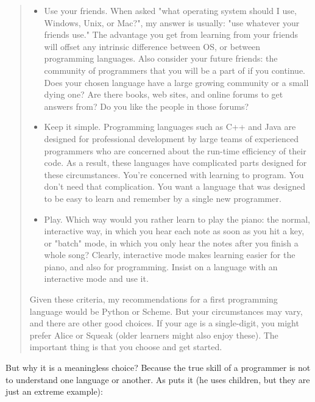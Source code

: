 \begin{quote}
    \begin{itemize}
        \item Use your friends. When asked "what operating system should I use,
        Windows, Unix, or Mac?", my answer is usually: "use whatever your friends
        use." The advantage you get from learning from your friends will offset any
        intrinsic difference between OS, or between programming languages. Also
        consider your future friends: the community of programmers that you will be
        a part of if you continue. Does your chosen language have a large growing
        community or a small dying one? Are there books, web sites, and online
        forums to get answers from? Do you like the people in those forums?  
        
        \item Keep it simple. Programming languages such as C++ and Java are designed for
        professional development by large teams of experienced programmers who are
        concerned about the run-time efficiency of their code. As a result, these
        languages have complicated parts designed for these circumstances. You're
        concerned with learning to program. You don't need that complication. You
        want a language that was designed to be easy to learn and remember by a
        single new programmer.  
        \item Play. Which way would you rather learn to play
        the piano: the normal, interactive way, in which you hear each note as soon
        as you hit a key, or "batch" mode, in which you only hear the notes after
        you finish a whole song? Clearly, interactive mode makes learning easier for
        the piano, and also for programming. Insist on a language with an
        interactive mode and use it.  
    \end{itemize} 
    
    Given these criteria, my recommendations for a first programming language
    would be Python or Scheme.  But your circumstances may vary, and there are
    other good choices. If your age is a single-digit, you might prefer Alice or
    Squeak (older learners might also enjoy these). The important thing is that
    you choose and get started.  
\end{quote}

But why it is a meaningless choice? Because the true skill of a programmer is
not to understand one language or another. As \cite{education:papert_mindstorms}
puts it (he uses children, but they are just an extreme example):

